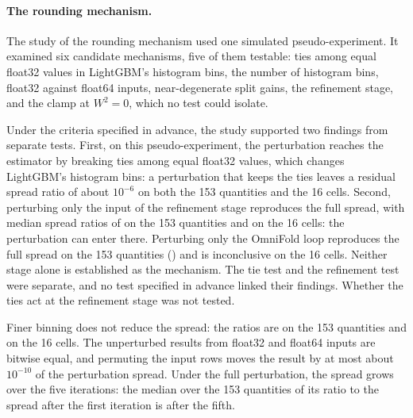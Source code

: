 \paragraph{The rounding mechanism.} The study of the rounding mechanism used one simulated pseudo-experiment. It examined six candidate mechanisms, five of them testable: ties among equal float32 values in LightGBM's histogram bins, the number of histogram bins, float32 against float64 inputs, near-degenerate split gains, the refinement stage, and the clamp at $W^{2}=0$, which no test could isolate.

Under the criteria specified in advance, the study supported two findings from separate tests. First, on this pseudo-experiment, the perturbation reaches the estimator by breaking ties among equal float32 values, which changes LightGBM's histogram bins: a perturbation that keeps the ties leaves a residual spread ratio of about $10^{-6}$ on both the 153 quantities and the 16 cells. Second, perturbing only the input of the refinement stage reproduces the full spread, with median spread ratios of  on the 153 quantities and  on the 16 cells: the perturbation can enter there. Perturbing only the OmniFold loop reproduces the full spread on the 153 quantities () and is inconclusive on the 16 cells. Neither stage alone is established as the mechanism. The tie test and the refinement test were separate, and no test specified in advance linked their findings. Whether the ties act at the refinement stage was not tested.

Finer binning does not reduce the spread: the ratios are  on the 153 quantities and  on the 16 cells. The unperturbed results from float32 and float64 inputs are bitwise equal, and permuting the input rows moves the result by at most about $10^{-10}$ of the perturbation spread. Under the full perturbation, the spread grows over the five iterations: the median over the 153 quantities of its ratio to the spread after the first iteration is  after the fifth.

